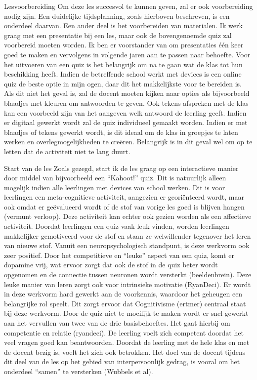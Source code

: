 \documentclass{article}
\begin{document}
{                Lesvoorbereiding
                Om deze les succesvol te kunnen geven, zal er ook voorbereiding nodig zijn. Een duidelijke tijdsplanning, zoals hierboven beschreven, is een onderdeel daarvan. Een ander deel is het voorbereiden van materialen. Ik werk graag met een presentatie bij een les, maar ook de bovengenoemde quiz zal voorbereid moeten worden. Ik ben er voorstander van om presentaties één keer goed te maken en vervolgens in volgende jaren aan te passen naar behoefte. Voor het uitvoeren van een quiz is het belangrijk om na te gaan wat de klas tot hun beschikking heeft. Indien de betreffende school werkt met devices is een online quiz de beste optie in mijn ogen, daar dit het makkelijkste voor te bereiden is. Als dit niet het geval is, zal de docent moeten kijken naar opties als bijvoorbeeld blaadjes met kleuren om antwoorden te geven. Ook tekens afspreken met de klas kan een voorbeeld zijn van het aangeven welk antwoord de leerling geeft. Indien er digitaal gewerkt wordt zal de quiz individueel gemaakt worden. Indien er met blaadjes of tekens gewerkt wordt, is dit ideaal om de klas in groepjes te laten werken en overlegmogelijkheden te creëren. Belangrijk is in dit geval wel om op te letten dat de activiteit niet te lang duurt. 
                
                
                Start van de les
                Zoals gezegd, start ik de les graag op een interactieve manier door middel van bijvoorbeeld een “Kahoot!” quiz. Dit is natuurlijk alleen mogelijk indien alle leerlingen met devices van school werken. Dit is voor leerlingen een meta-cognitieve activiteit, aangezien er georiënteerd wordt, maar ook	 omdat er geëvalueerd wordt of de stof van vorige les goed is blijven hangen (vermunt verloop). Deze activiteit kan echter ook gezien worden als een affectieve activiteit. Doordat leerlingen een quiz vaak leuk vinden, worden leerlingen makkelijker gemotiveerd voor de stof en staan ze welwillender tegenover het leren van nieuwe stof. 
                Vanuit een neuropsychologisch standpunt, is deze werkvorm ook zeer positief. Door het competitieve en “leuke” aspect van een quiz, komt er dopamine vrij, wat ervoor zorgt dat ook de stof in de quiz beter wordt opgenomen en de connectie tussen neuronen wordt versterkt (beeldenbrein). Deze leuke manier van leren zorgt ook voor intrinsieke motivatie (RyanDeci).
                Er wordt in deze werkvorm hard gewerkt aan de voorkennis, waardoor het geheugen een belangrijke rol speelt. Dit zorgt ervoor dat Cognitivisme (ertmer) centraal staat bij deze werkvorm.
                Door de quiz niet te moeilijk te maken wordt er snel gewerkt aan het vervullen van twee van de drie basisbehoeftes. Het gaat hierbij om competentie en relatie (ryandeci). De leerling voelt zich competent doordat het veel vragen goed kan beantwoorden. Doordat de leerling met de hele klas en met de docent bezig is, voelt het zich ook betrokken. 
                Het doel van de docent tijdens dit deel van de les op het gebied van interpersoonlijk gedrag, is vooral om het onderdeel “samen” te versterken (Wubbels et al). 
                
}
\end{document}
